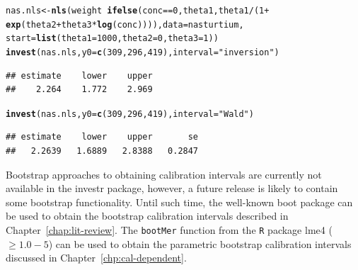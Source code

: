 \documentclass[cmfont,usenames,dvipsnames,leqno]{afit-etd}\usepackage[]{graphicx}\usepackage[]{color}
\makeatletter
\newcommand{\hlnum}[1]{\textcolor[rgb]{0.686,0.059,0.569}{#1}}%
\newcommand{\hlstr}[1]{\textcolor[rgb]{0.192,0.494,0.8}{#1}}%
\newcommand{\hlopt}[1]{\textcolor[rgb]{0,0,0}{#1}}%
\newcommand{\hlstd}[1]{\textcolor[rgb]{0.345,0.345,0.345}{#1}}%
\newcommand{\hlkwb}[1]{\textcolor[rgb]{0.69,0.353,0.396}{#1}}%
\newcommand{\hlkwc}[1]{\textcolor[rgb]{0.333,0.667,0.333}{#1}}%
\newcommand{\hlkwd}[1]{\textcolor[rgb]{0.737,0.353,0.396}{\textbf{#1}}}%
\newenvironment{kframe}{%
 \def\at@end@of@kframe{}%
 \ifinner\ifhmode%
  \def\at@end@of@kframe{\end{minipage}}%
  \begin{minipage}{\columnwidth}%
 \fi\fi%
 \def\FrameCommand##1{\hskip\@totalleftmargin \hskip-\fboxsep
 \colorbox{shadecolor}{##1}\hskip-\fboxsep
     \hskip-\linewidth \hskip-\@totalleftmargin \hskip\columnwidth}%
 \MakeFramed {\advance\hsize-\width
   \@totalleftmargin\z@ \linewidth\hsize
   \@setminipage}}%
 {\par\unskip\endMakeFramed%
 \at@end@of@kframe}
\newenvironment{knitrout}{}{} %
\renewenvironment{knitrout}{\begin{singlespace}}{\end{singlespace}}
\newcommand{\code}[1]{\texttt{\small{#1}}}
\newcommand{\pkg}[1]{\textsf{\small{#1}}}
\makeatother
\begin{document}
\begin{knitrout}
\color{fgcolor}\begin{kframe}
\begin{alltt}
\hlstd{nas.nls} \hlkwb{<-} \hlkwd{nls}\hlstd{(weight} \hlopt{~} \hlkwd{ifelse}\hlstd{(conc} \hlopt{==} \hlnum{0}\hlstd{, theta1, theta1}\hlopt{/}\hlstd{(}\hlnum{1} \hlopt{+}
    \hlkwd{exp}\hlstd{(theta2} \hlopt{+} \hlstd{theta3} \hlopt{*} \hlkwd{log}\hlstd{(conc)))),} \hlkwc{data} \hlstd{= nasturtium,}
    \hlkwc{start} \hlstd{=} \hlkwd{list}\hlstd{(}\hlkwc{theta1} \hlstd{=} \hlnum{1000}\hlstd{,} \hlkwc{theta2} \hlstd{=} \hlnum{0}\hlstd{,} \hlkwc{theta3} \hlstd{=} \hlnum{1}\hlstd{))}
\hlkwd{invest}\hlstd{(nas.nls,} \hlkwc{y0} \hlstd{=} \hlkwd{c}\hlstd{(}\hlnum{309}\hlstd{,} \hlnum{296}\hlstd{,} \hlnum{419}\hlstd{),} \hlkwc{interval} \hlstd{=} \hlstr{"inversion"}\hlstd{)}
\end{alltt}
\begin{verbatim}
## estimate    lower    upper 
##    2.264    1.772    2.969
\end{verbatim}
\begin{alltt}
\hlkwd{invest}\hlstd{(nas.nls,} \hlkwc{y0} \hlstd{=} \hlkwd{c}\hlstd{(}\hlnum{309}\hlstd{,} \hlnum{296}\hlstd{,} \hlnum{419}\hlstd{),} \hlkwc{interval} \hlstd{=} \hlstr{"Wald"}\hlstd{)}
\end{alltt}
\begin{verbatim}
## estimate    lower    upper       se 
##   2.2639   1.6889   2.8388   0.2847
\end{verbatim}
\end{kframe}
\end{knitrout}


Bootstrap approaches to obtaining calibration intervals are currently not available in the \pkg{investr} package, however, a future release is likely to contain some bootstrap functionality. Until such time, the well-known \pkg{boot} package can be used to obtain the bootstrap calibration intervals described in Chapter~\ref{chap:lit-review}. The \code{bootMer} function from the \code{R} package \pkg{lme4} ($\ge 1.0-5$) can be used to obtain the parametric bootstrap calibration intervals discussed in Chapter~\ref{chp:cal-dependent}.



\end{document}
